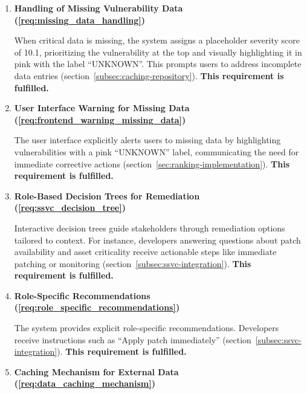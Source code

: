\begin{enumerate}
    The \enquote{Score Details} interface displays comprehensive vulnerability information, including \ac{CVE} identifiers, metrics, and an interactive, pre-filled link to the official \ac{CVSS} calculator. Interactive tooltips offer detailed explanations for terms like \enquote{Attack Vector} (section~\ref{sec:frontend-components}). \textbf{This requirement is fulfilled.}
	      	      
    \item \textbf{Handling of Missing Vulnerability Data (\ref{req:missing_data_handling})}
    
    When critical data is missing, the system assigns a placeholder severity score of 10.1, prioritizing the vulnerability at the top and visually highlighting it in pink with the label \enquote{UNKNOWN}. This prompts users to address incomplete data entries (section~\ref{subsec:caching-repository}). \textbf{This requirement is fulfilled.}
	      	      
    \item \textbf{User Interface Warning for Missing Data (\ref{req:frontend_warning_missing_data})}
	      	      
    The user interface explicitly alerts users to missing data by highlighting vulnerabilities with a pink \enquote{UNKNOWN} label, communicating the need for immediate corrective actions (section~\ref{sec:ranking-implementation}). \textbf{This requirement is fulfilled.}
	      	      
    \item \textbf{Role-Based Decision Trees for Remediation (\ref{req:ssvc_decision_tree})}
	      	      
    Interactive decision trees guide stakeholders through remediation options tailored to context. For instance, developers answering questions about patch availability and asset criticality receive actionable steps like immediate patching or monitoring (section~\ref{subsec:ssvc-integration}). \textbf{This requirement is fulfilled.}
	      	      
    \item \textbf{Role-Specific Recommendations (\ref{req:role_specific_recommendations})}
	      	      
    The system provides explicit role-specific recommendations. Developers receive instructions such as \enquote{Apply patch immediately} (section~\ref{subsec:ssvc-integration}). \textbf{This requirement is fulfilled.}
	      	      
    \item \textbf{Caching Mechanism for External Data (\ref{req:data_caching_mechanism})}
	      	      

\end{enumerate}
